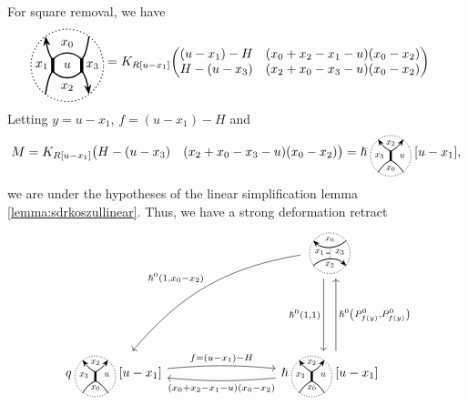 \documentclass{article}
\newcommand{\id}{\mathrm{id}}
\newcommand{\kmf}[2]{
	K_{#1}{\begin{pmatrix}
			#2
		\end{pmatrix}
	}	
}
\theoremstyle{plain} %
\theoremstyle{definition} %
\theoremstyle{remark} %
\begin{document}
For square removal, we have
\begin{align*}
	\SquareStandard{u} 
	&
	= \kmf{R[u-x_1]}
	{		(u-x_1)-H & (x_0+x_2-x_1-u)(x_0-x_2)\\
		H-(u-x_3) & (x_2+x_0-x_3-u)(x_0-x_2)
	}
\end{align*}
Letting $y=u-x_1$, $f=(u-x_1)-H$ and 
$$
M=\kmf{R[u-x_1]}
{
	H-(u-x_3) & (x_2+x_0-x_3-u)(x_0-x_2)
} = \hslash\scalebox{0.7}{\ThickEdge{x_2}{x_3}{x_0}{u}}[u-x_1] 
,
$$
we are under the hypotheses of the linear simplification lemma \ref{lemma:sdrkoszullinear}. Thus, we have a strong deformation retract
\[
\begin{tikzcd}[column sep=3cm, row sep=2cm]
	&
	\scalebox{0.7}{\UnorientedVerticalThinEdge{x_0}{x_1}{x_2}{x_3}{-}} 
	\arrow[d, shift right=2, "{\hslash^0(1,1)}", swap] 
	\arrow[dl, bend right=20, "{\hslash^0(1,x_0-x_2)}",swap] 
	\\   
	q \scalebox{0.7}{\ThickEdge{x_2}{x_3}{x_0}{u}}[u-x_1] 
	\arrow[r, "f=(u-x_1)-H", bend left=5]
	& 
	\hslash \scalebox{0.7}{\ThickEdge{x_2}{x_3}{x_0}{u}}[u-x_1] 
	\arrow[l, "(x_0+x_2-x_1-u)(x_0-x_2)", bend left=5]
	\arrow[u, shift right=2, "{\hslash^0\left(P^0_{f(y)}, P^0_{f(y)}\right)}",swap]
\end{tikzcd}
\]


%
%
\end{document}

